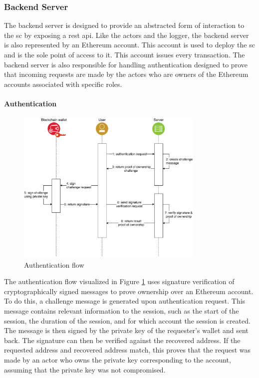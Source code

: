 \subsubsection{Backend Server}
The backend server is designed to provide an abstracted form of interaction to the \gls{sc} by exposing a \gls{rest} \gls{api}. Like the actors and the logger, the backend server is also represented by an Ethereum account. This account is used to deploy the \gls{sc} and is the sole point of access to it. This account issues every transaction. The backend server is also responsible for handling authentication designed to prove that incoming requests are made by the actors who are owners of the Ethereum accounts associated with specific roles.

\paragraph{Authentication}
\label{sec:authentication}


\begin{figure}[h]
    \centering
    \includegraphics[width=0.8\textwidth, keepaspectratio]{diagrams/authentication_flow.drawio.pdf}
    \caption{Authentication flow}
    \label{fig:auth_flow}
\end{figure}

The authentication flow visualized in Figure \ref{fig:auth_flow} uses signature verification of cryptographically signed messages to prove ownership over an Ethereum account. To do this, a challenge message is generated upon authentication request. This message contains relevant information to the session, such as the start of the session, the duration of the session, and for which account the session is created. The message is then signed by the private key of the requester's wallet and sent back. The signature can then be verified against the recovered address. If the requested address and recovered address match, this proves that the request was made by an actor who owns the private key corresponding to the account, assuming that the private key was not compromised.

